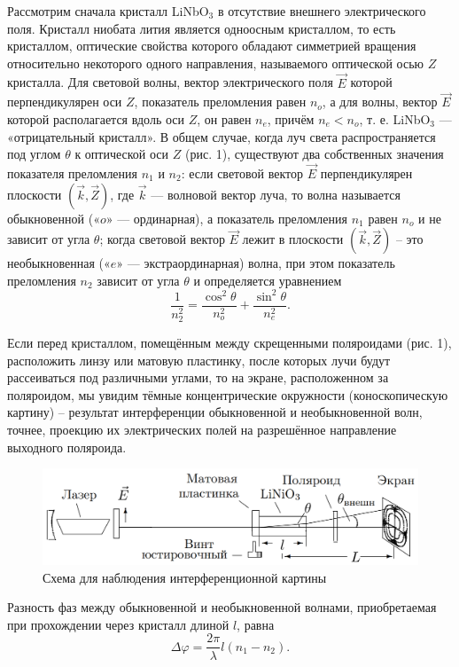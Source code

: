 \documentclass[a4paper,12pt]{article} %
\begin{document}
	
	Рассмотрим сначала кристалл LiNbO$_3$ в отсутствие внешнего электрического поля. Кристалл ниобата лития является одноосным кристаллом, то есть кристаллом, оптические свойства которого обладают симметрией вращения относительно некоторого одного направления, называемого оптической осью $Z$ кристалла. 
	Для световой волны, вектор электрического поля $\vec{E}$ которой перпендикулярен оси $Z$, показатель преломления равен $n_o$, а для волны, вектор $\vec{E}$ которой располагается вдоль оси $Z$, он равен $n_e$, причём $n_e < n_o$, т. е. LiNbO$_3$ — «отрицательный кристалл». В общем случае, когда луч света распространяется под углом $\theta$ к оптической оси $Z$ (рис. 1), существуют два собственных значения показателя преломления $n_1$ и $n_2$: если световой вектор $\vec{E}$ перпендикулярен плоскости $(\vec{k},\vec{Z})$, где $\vec{k}$ — волновой вектор луча, то волна называется обыкновенной («$o$» — ординарная), а показатель преломления $n_1$ равен $n_o$ и не зависит от угла $\theta$; когда световой вектор $\vec{E}$ лежит в плоскости $(\vec{k},\vec{Z})$ -- это необыкновенная («$e$» — экстраординарная) волна, при этом показатель преломления $n_2$ зависит от угла $\theta$ и определяется уравнением
	\begin{equation*}
		\frac{1}{n_2^2} = \frac{\cos^2\theta}{n_o^2} + \frac{\sin^2\theta}{n_e^2}.
	\end{equation*}
	
	Если перед кристаллом, помещённым между скрещенными поляроидами (рис. 1), расположить линзу или матовую пластинку, после которых лучи будут рассеиваться под различными углами, то на экране, расположенном за поляроидом, мы увидим тёмные концентрические окружности (коноскопическую картину) -- результат интерференции обыкновенной и необыкновенной волн, точнее, проекцию их электрических полей на разрешённое направление выходного поляроида.
	
	\begin{figure}
		\centering
		\includegraphics[width=\linewidth]{Pictures/Установка}
		\caption{Схема для наблюдения интерференционной картины}
	\end{figure}


	Разность фаз между обыкновенной и необыкновенной волнами, приобретаемая при прохождении через кристалл длиной $l$, равна
	\begin{equation*}
		\Delta \varphi = \frac{2\pi}{\lambda} l (n_1 - n_2).
	\end{equation*}
\end{document}
